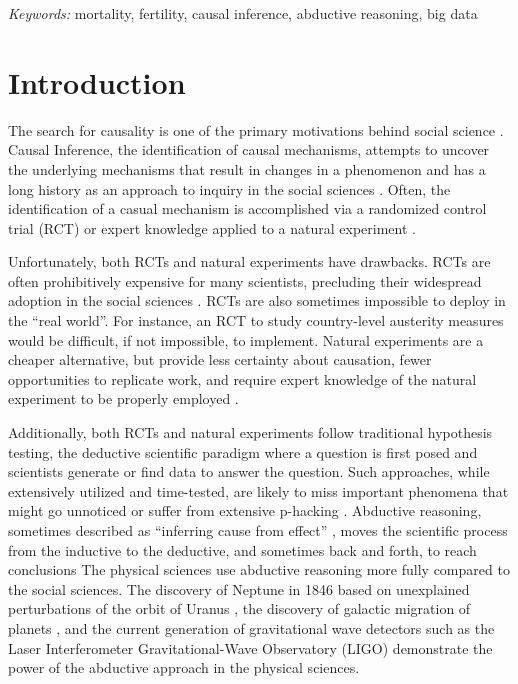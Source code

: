 \documentclass[12pt]{article}
\begin{document}
\noindent%
{\it Keywords:} mortality, fertility, causal inference, abductive reasoning, big data
\vfill

\newpage
{} %

\newpage

\hypertarget{introduction}{%
\section{Introduction}\label{introduction}}

The search for causality is one of the primary motivations behind social
science \citep{smith2011commentary, pearl2009causal}. Causal Inference,
the identification of causal mechanisms, attempts to uncover the
underlying mechanisms that result in changes in a phenomenon and has a
long history as an approach to inquiry in the social sciences
\citep{grimmer2015ppsp}. Often, the identification of a casual mechanism
is accomplished via a randomized control trial (RCT) or expert knowledge
applied to a natural experiment \citep{salganik2019bit}.

Unfortunately, both RCTs and natural experiments have drawbacks. RCTs
are often prohibitively expensive for many scientists, precluding their
widespread adoption in the social sciences \citep{west2008ajph}. RCTs
are also sometimes impossible to deploy in the ``real world''. For
instance, an RCT to study country-level austerity measures would be
difficult, if not impossible, to implement. Natural experiments are a
cheaper alternative, but provide less certainty about causation, fewer
opportunities to replicate work, and require expert knowledge of the
natural experiment to be properly employed \citep{pearl2018book}.

Additionally, both RCTs and natural experiments follow traditional
hypothesis testing, the deductive scientific paradigm where a question
is first posed and scientists generate or find data to answer the
question. Such approaches, while extensively utilized and time-tested,
are likely to miss important phenomena that might go unnoticed or suffer
from extensive p-hacking
\citep{head2015extent, nuzzo2014scientific, ruggles2014big}. Abductive
reasoning, sometimes described as ``inferring cause from effect''
\citep{Crowder2017}, moves the scientific process from the inductive to
the deductive, and sometimes back and forth, to reach conclusions
\citep{bryant2014realm} The physical sciences use abductive reasoning
more fully compared to the social sciences. The discovery of Neptune in
1846 based on unexplained perturbations of the orbit of Uranus
\citep{popper2005logic}, the discovery of galactic migration of planets
\citep{gomes2005n}, and the current generation of gravitational wave
detectors such as the Laser Interferometer Gravitational-Wave
Observatory (LIGO) \citep{harry2010advanced} demonstrate the power of
the abductive approach in the physical sciences.
\end{document}
